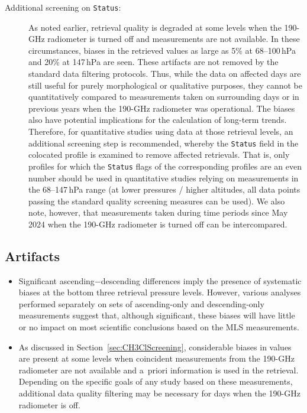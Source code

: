 \begin{nofloatpages}
\begin{description}
  \item[Additional screening on  \texttt{Status}:] As noted earlier,  retrieval quality is degraded at some levels when the \mbox{190\nobreakdash-GHz} radiometer is turned off and  measurements are not available. In these circumstances, biases in the retrieved  values as large as 5\% at 68--100\,hPa and 20\% at 147\,hPa are seen. These artifacts are not removed by the standard  data filtering protocols. Thus, while the  data on affected days are still useful for purely morphological or qualitative purposes, they cannot be quantitatively compared to measurements taken on surrounding days or in previous years when the \mbox{190\nobreakdash-GHz} radiometer was operational. The biases also have potential implications for the calculation of long-term trends. Therefore, for quantitative studies using  data at those retrieval levels, an additional screening step is recommended, whereby the \texttt{Status} field in the colocated  profile is examined to remove affected  retrievals. That is, only  profiles for which the \texttt{Status} flags of the corresponding  profiles are an even number should be used in quantitative studies relying on  measurements in the 68--147\,hPa range (at lower pressures / higher altitudes, all  data points passing the standard quality screening measures can be used). We also note, however, that measurements taken during time periods since May 2024 when the \mbox{190\nobreakdash-GHz} radiometer is turned off can be intercompared.
  
\end{description}
\end{nofloatpages}

\subsection{Artifacts}

\begin{itemize}
  \item Significant ascending$-$descending differences imply the presence of systematic biases at the bottom three retrieval pressure levels. However, various analyses performed separately on sets of ascending-only and descending-only measurements suggest that, although significant, these biases will have little or no impact on most scientific conclusions based on the MLS  measurements.
  \item As discussed in Section~\ref{sec:CH3ClScreening}, considerable biases in  values are present at some levels when coincident measurements from the \mbox{190\nobreakdash-GHz} radiometer are not available and  a~priori information is used in the  retrieval. Depending on the specific goals of any study based on these measurements, additional  data quality filtering may be necessary for days when the \mbox{190\nobreakdash-GHz} radiometer is off.
\end{itemize}

